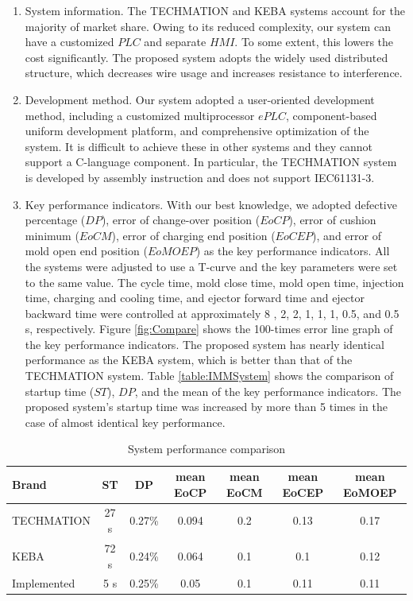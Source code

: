 \documentclass[journal,UTF8]{IEEEtran}
\begin{document}
\begin{enumerate}
	\item System information. The TECHMATION and KEBA systems account for the majority of market share. Owing to its reduced complexity, our system can have a customized $PLC$ and separate $HMI$. To some extent, this lowers the cost significantly. The proposed system adopts the widely used distributed structure, which decreases wire usage and increases resistance to interference.
	\item Development method. Our system adopted a user-oriented development method, including a customized multiprocessor $ePLC$, component-based uniform development platform, and comprehensive optimization of the system. It is difficult to achieve these in other systems and they cannot support a C-language component. In particular, the TECHMATION system is developed by assembly instruction and does not support IEC61131-3.
	\item Key performance indicators. With our best knowledge, we adopted defective percentage ($DP$), error of change-over position ($EoCP$), error of cushion minimum ($EoCM$), error of charging end position ($EoCEP$), and error of mold open end position ($EoMOEP$) as the key performance indicators. All the systems were adjusted to use a T-curve and the key parameters were set to the same value. The cycle time, mold close time, mold open time, injection time, charging and cooling time, and ejector forward time and ejector backward time were controlled at approximately 8 , 2, 2, 1, 1, 1, 0.5, and 0.5 s, respectively. Figure \ref{fig:Compare} shows the 100-times error line graph of the key performance indicators. The proposed system has nearly identical performance as the KEBA system, which is better than that of the TECHMATION system. Table \ref{table:IMMSystem} shows the comparison of startup time ($ST$), $DP$, and the mean of the key performance indicators. The proposed system's startup time was increased by more than 5 times in the case of almost identical key performance.
\end{enumerate}
\begin{table}
	\scriptsize \caption{System performance comparison}
	\label{table:ComparisonG}
	\begin{center}
		\renewcommand{\arraystretch}{1.4}
		\setlength\tabcolsep{3pt}
		\begin{tabular}{|l|c|c|c|c|c|c|}
			\hline
			Brand & ST &DP&mean EoCP&mean EoCM&mean EoCEP&mean EoMOEP\\
			\hline
			TECHMATION  & 27 s  &0.27\% &0.094 & 0.2 & 0.13 & 0.17 \\
			\hline
			KEBA        & 72 s  &0.24\% &0.064 & 0.1 & 0.1 & 0.12 \\
			\hline
			Implemented   & 5 s     &0.25\% &0.05 & 0.1 & 0.11 & 0.11\\
			\hline
		\end{tabular}
	\end{center}
\end{table}
\end{document}
